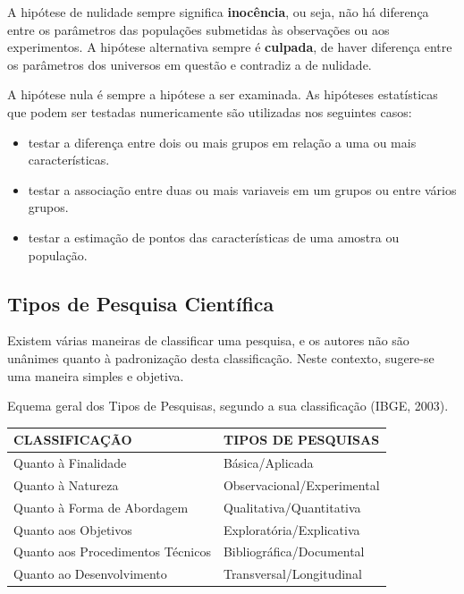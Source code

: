 A hipótese de nulidade sempre significa \textbf{inocência}, ou seja, não há diferença entre os parâmetros das populações submetidas às observações ou aos experimentos. A hipótese alternativa sempre é \textbf{culpada}, de haver diferença entre os parâmetros dos universos em questão e contradiz a de nulidade.\vskip0.3cm



A hipótese nula é sempre a hipótese a ser examinada. As hipóteses estatísticas que podem ser testadas numericamente são utilizadas nos seguintes casos:

\begin{itemize}
\item testar a diferença entre dois ou mais grupos em relação a uma ou mais características.
\item testar a associação entre duas ou mais variaveis em um grupos ou entre vários grupos. 
\item testar a estimação de pontos das características de uma amostra ou população.
\end{itemize}


\newpage
\subsection{Tipos de Pesquisa Científica}

\inic Existem várias maneiras de classificar uma pesquisa, e os autores não são unânimes quanto à padronização desta classificação. Neste contexto, sugere-se uma maneira simples e objetiva.\vskip0.3cm 

\begin{quadro}[h!tp]
    \centering
    \caption{Equema geral dos Tipos de Pesquisas, segundo a sua classificação (IBGE, 2003).}
    \begin{tabular}{|l|l|}
    \hline \hline
    CLASSIFICAÇÃO                & TIPOS DE PESQUISAS   \\    
    \hline\hline
     Quanto à Finalidade         & Básica/Aplicada \\
     \hline
     Quanto à Natureza           & Observacional/Experimental  \\
     \hline
    Quanto à Forma de Abordagem  & Qualitativa/Quantitativa \\
    \hline
     Quanto aos Objetivos        & Exploratória/Explicativa \\
     \hline
    Quanto aos Procedimentos Técnicos     & Bibliográfica/Documental             \\
       \hline     
    Quanto ao Desenvolvimento    & Transversal/Longitudinal              \\
  \hline\hline
    \end{tabular}
\end{quadro}






